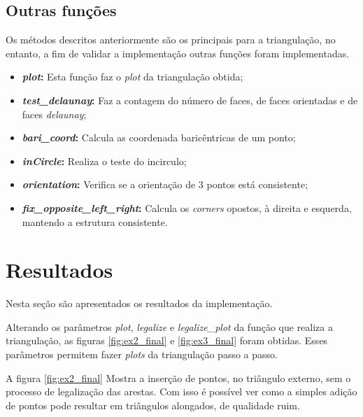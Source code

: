 \documentclass[a4paper]{article}
\begin{document}
\subsection{Outras funções}

Os métodos descritos anteriormente são os principais para a triangulação, no entanto, a fim de validar a implementação outras funções foram implementadas.

\begin{itemize}	
	\item \textbf{\textit{plot}:} Esta função faz o \textit{plot} da triangulação obtida;
	\item \textbf{\textit{test\_delaunay}:} Faz a contagem do número de faces, de faces orientadas e de faces \textit{delaunay};
	\item \textbf{\textit{bari\_coord}:} Calcula as coordenada baricêntricas de um ponto;
	\item \textbf{\textit{inCircle}:} Realiza o teste do incirculo;
	\item \textbf{\textit{orientation}:} Verifica se a orientação de 3 pontos está consistente;
	\item \textbf{\textit{fix\_opposite\_left\_right}:} Calcula os \textit{corners} opostos, à direita e esquerda, mantendo a estrutura consistente.
\end{itemize}



\section{Resultados}


Nesta seção são apresentados os resultados da implementação.


Alterando os parâmetros \textit{plot}, \textit{legalize} e \textit{legalize\_plot} da função que realiza a triangulação, as figuras \ref{fig:ex2_final} e \ref{fig:ex3_final} foram obtidas. Esses parâmetros permitem fazer \textit{plots} da triangulação passo a passo.

A figura \ref{fig:ex2_final} Mostra a inserção de pontos, no triângulo externo, sem o processo de legalização das arestas. Com isso é possível ver como a simples adição de pontos pode resultar em triângulos alongados, de qualidade ruim. 
\end{document}
